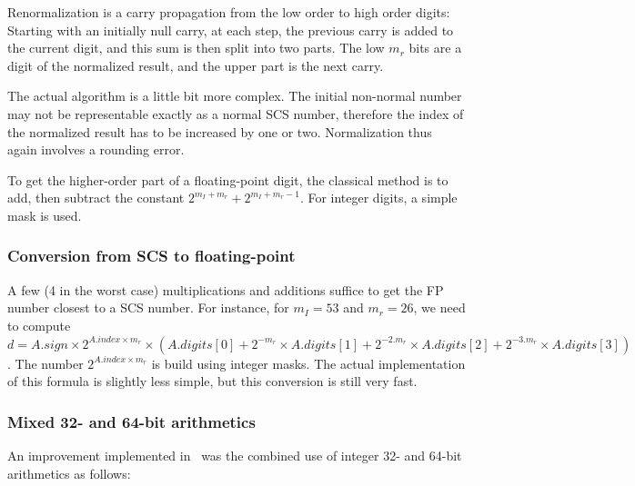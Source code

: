 Renormalization is a carry propagation from the low
order to high order digits:  Starting with an initially null carry, at
each step, the previous carry is added to the current digit, and this
sum is then split into two parts. The low $m_r$ bits are a digit of
the normalized result, and the upper part is the next carry.

The actual algorithm is a little bit more complex. The initial
non-normal number may not be representable exactly as a normal SCS
number, therefore the index of the normalized result has to be
increased by one or two.  Normalization thus again involves a rounding
error.

To get the higher-order part of a floating-point digit, the classical
method is to add, then subtract the constant
$2^{m_I+m_r}+2^{m_I+m_r-1}$. For integer digits, a simple mask is used.



\subsubsection{Conversion from SCS to floating-point}

A few (4 in the worst case) multiplications and additions suffice to
get the FP number closest to a SCS number.  For instance, for $m_I=53$
and $m_r=26$, we need to compute $d = A.sign \times 2^{A.index \times
  m_r} \times ( A.digits[0]+ 2^{-m_r} \times A.digits[1]+ 2^{-2.m_r}
\times A.digits[2]+ 2^{-3.m_r} \times A.digits[3])$. The number
$2^{A.index \times m_r}$ is build using integer masks. The actual
implementation of this formula is slightly less simple, but this
conversion is still very fast.


\subsubsection{Mixed 32- and 64-bit arithmetics}

An improvement implemented in \scslib\ was the combined use of integer 32- and 64-bit
arithmetics as follows: 

